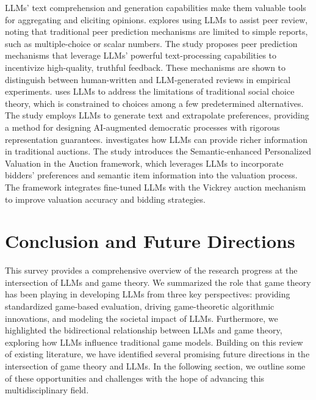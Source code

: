 LLMs' text comprehension and generation capabilities make them valuable tools for aggregating and eliciting opinions.
\cite{lu2024eliciting} explores using LLMs to assist peer review, noting that traditional peer prediction mechanisms are limited to simple reports, such as multiple-choice or scalar numbers. 
The study proposes peer prediction mechanisms that leverage LLMs' powerful text-processing capabilities to incentivize high-quality, truthful feedback. 
These mechanisms are shown to distinguish between human-written and LLM-generated reviews in empirical experiments. 
\cite{fish2023generative} uses LLMs to address the limitations of traditional social choice theory, which is constrained to choices among a few predetermined alternatives. The study employs LLMs to generate text and extrapolate preferences, providing a method for designing AI-augmented democratic processes with rigorous representation guarantees. 
\cite{sun2024large} investigates how LLMs can provide richer information in traditional auctions. The study introduces the Semantic-enhanced Personalized Valuation in the Auction framework, which leverages LLMs to incorporate bidders' preferences and semantic item information into the valuation process. The framework integrates fine-tuned LLMs with the Vickrey auction mechanism to improve valuation accuracy and bidding strategies.


\section{Conclusion and Future Directions}
This survey provides a comprehensive overview of the research progress at the intersection of LLMs and game theory. We summarized the role that game theory has been playing in developing LLMs from three key perspectives: providing standardized game-based evaluation, driving game-theoretic algorithmic innovations, and modeling the societal impact of LLMs.
Furthermore, we highlighted the bidirectional relationship between LLMs and game theory, exploring how LLMs influence traditional game models. 
Building on this review of existing literature, we have identified several promising future directions in the intersection of game theory and LLMs. In the following section, we outline some of these opportunities and challenges with the hope of advancing this multidisciplinary field.

